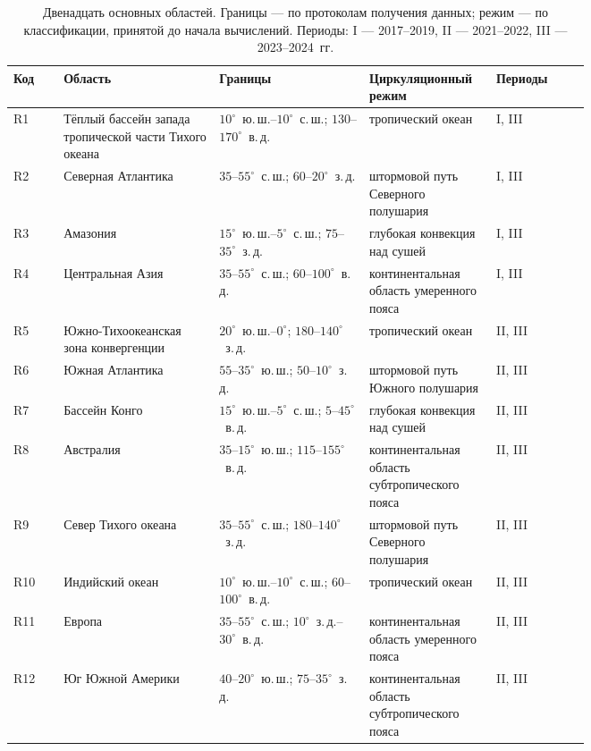 \documentclass[11pt,a4paper]{article}
\begin{document}
\begin{table}[tbp]
\centering\footnotesize
\caption{Двенадцать основных областей. Границы --- по протоколам получения данных; режим --- по классификации, принятой до начала вычислений. Периоды: I --- 2017--2019, II --- 2021--2022, III --- 2023--2024~гг.}
\label{tab:regions}
\begin{tabular}{@{}l>{\raggedright\arraybackslash}p{0.27\linewidth}>{\raggedright\arraybackslash}p{0.26\linewidth}>{\raggedright\arraybackslash}p{0.22\linewidth}l@{}}
\toprule
Код & Область & Границы & Циркуляционный режим & Периоды\\
\midrule
R1 & Тёплый бассейн запада тропической части Тихого океана & $10^\circ$~ю.\,ш.--$10^\circ$~с.\,ш.; $130$--$170^\circ$~в.\,д. & тропический океан & I, III\\
R2 & Северная Атлантика & $35$--$55^\circ$~с.\,ш.; $60$--$20^\circ$~з.\,д. & штормовой путь Северного полушария & I, III\\
R3 & Амазония & $15^\circ$~ю.\,ш.--$5^\circ$~с.\,ш.; $75$--$35^\circ$~з.\,д. & глубокая конвекция над сушей & I, III\\
R4 & Центральная Азия & $35$--$55^\circ$~с.\,ш.; $60$--$100^\circ$~в.\,д. & континентальная область умеренного пояса & I, III\\
R5 & Южно-Тихоокеанская зона конвергенции & $20^\circ$~ю.\,ш.--$0^\circ$; $180$--$140^\circ$~з.\,д. & тропический океан & II, III\\
R6 & Южная Атлантика & $55$--$35^\circ$~ю.\,ш.; $50$--$10^\circ$~з.\,д. & штормовой путь Южного полушария & II, III\\
R7 & Бассейн Конго & $15^\circ$~ю.\,ш.--$5^\circ$~с.\,ш.; $5$--$45^\circ$~в.\,д. & глубокая конвекция над сушей & II, III\\
R8 & Австралия & $35$--$15^\circ$~ю.\,ш.; $115$--$155^\circ$~в.\,д. & континентальная область субтропического пояса & II, III\\
R9 & Север Тихого океана & $35$--$55^\circ$~с.\,ш.; $180$--$140^\circ$~з.\,д. & штормовой путь Северного полушария & II, III\\
R10 & Индийский океан & $10^\circ$~ю.\,ш.--$10^\circ$~с.\,ш.; $60$--$100^\circ$~в.\,д. & тропический океан & II, III\\
R11 & Европа & $35$--$55^\circ$~с.\,ш.; $10^\circ$~з.\,д.--$30^\circ$~в.\,д. & континентальная область умеренного пояса & II, III\\
R12 & Юг Южной Америки & $40$--$20^\circ$~ю.\,ш.; $75$--$35^\circ$~з.\,д. & континентальная область субтропического пояса & II, III\\
\bottomrule
\end{tabular}
\end{table}
\end{document}
